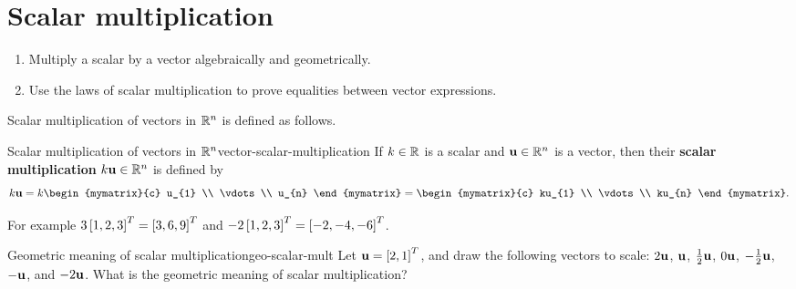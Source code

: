 \section{Scalar multiplication}

\begin{outcome}
  \begin{enumerate}
  \item Multiply a scalar by a vector algebraically and geometrically.
  \item Use the laws of scalar multiplication to prove equalities
    between vector expressions.
  \end{enumerate}
\end{outcome}

Scalar multiplication of vectors in $\mathbb{R}^n$ is defined as 
follows.

\begin{definition}{Scalar multiplication of vectors in $\mathbb{R}^n$}{vector-scalar-multiplication}
  If $k\in\mathbb{R}$ is a scalar and $\mbox{\bf u}\in \mathbb{R}^{n}$ is a vector, then
  their
  \textbf{scalar multiplication}%
  $k\mbox{\bf u}\in \mathbb{R}^{n}$ is defined by
  \begin{equation*}
    k\vect{u}=k\begin{mymatrix}{c}
      u_{1} \\
      \vdots \\
      u_{n}
    \end{mymatrix} = \begin{mymatrix}{c}
      ku_{1} \\
      \vdots \\
      ku_{n}
    \end{mymatrix}.
  \end{equation*}
\end{definition}

For example $3 \left[ 1, 2, 3 \right]^T = \left[ 3, 6, 9 \right]^T$ and
$-2\left[ 1, 2, 3 \right]^T = \left[ -2, -4, -6 \right]^T$.

\begin{example}{Geometric meaning of scalar multiplication}{geo-scalar-mult}
  Let $\mbox{\bf u}=\left[2,1\right]^T$, and draw the following vectors to scale:
  $2\mbox{\bf u}$, $\mbox{\bf u}$, $\frac{1}{2}\mbox{\bf u}$, $0\mbox{\bf u}$,
  $-\frac{1}{2}\mbox{\bf u}$, $-\mbox{\bf u}$, and $-2\mbox{\bf u}$.  What is the
  geometric meaning of scalar multiplication?
\end{example}

